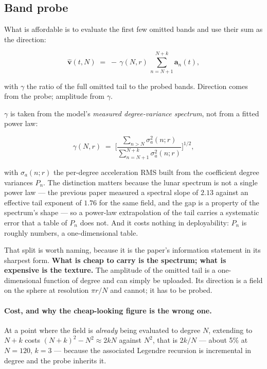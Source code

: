 \subsection{Band probe}

What is affordable is to evaluate the first few omitted bands and use their sum
as the direction:

\begin{equation}
  \hat{\mathbf v}(t,N)
  \;=\; -\,\gamma(N,r)\,\sum_{n=N+1}^{N+k}\mathbf a_n(t) ,
  \label{eq:probe}
\end{equation}

with $\gamma$ the ratio of the full omitted tail to the probed bands. Direction
comes from the probe; amplitude from $\gamma$.

$\gamma$ is taken from the model's \emph{measured degree-variance spectrum},
not from a fitted power law:

\begin{equation}
  \gamma(N,r) \;=\;
  \Biggl[\frac{\sum_{n>N}\sigma_a^2(n;r)}
              {\sum_{n=N+1}^{N+k}\sigma_a^2(n;r)}\Biggr]^{1/2} ,
  \label{eq:gamma}
\end{equation}

with $\sigma_a(n;r)$ the per-degree acceleration RMS built from the coefficient
degree variances $P_n$. The distinction matters because the lunar spectrum is
not a single power law --- the previous paper measured a spectral slope of
$2.13$ against an effective tail exponent of $1.76$ for the same field, and the
gap is a property of the spectrum's shape --- so a power-law extrapolation of
the tail carries a systematic error that a table of $P_n$ does not. And it
costs nothing in deployability: $P_n$ is roughly  numbers, a
one-dimensional table.

That split is worth naming, because it is the paper's information statement in
its sharpest form. \textbf{What is cheap to carry is the spectrum; what is
expensive is the texture.} The amplitude of the omitted tail is a
one-dimensional function of degree and can simply be uploaded. Its direction is
a field on the sphere at resolution $\pi r/N$ and cannot; it has to be probed.

\paragraph{Cost, and why the cheap-looking figure is the wrong one.} At a point
where the field is \emph{already} being evaluated to degree $N$, extending to
$N{+}k$ costs $(N{+}k)^2-N^2\approx 2kN$ against $N^2$, that is $2k/N$ --- about
5\% at $N=120$, $k=3$ --- because the associated Legendre recursion is
incremental in degree and the probe inherits it.


